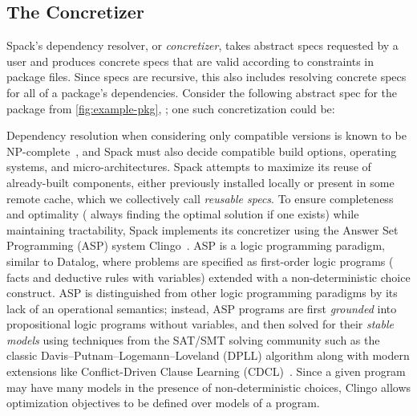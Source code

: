 \subsection{The Concretizer}
\label{sec:spack-concretizer}
Spack's dependency resolver, or {\it concretizer}, takes abstract specs
requested by a user and produces concrete specs that are valid according
to constraints in package files. Since specs are recursive, this also
includes resolving concrete specs for all of a package's
dependencies. Consider the following abstract spec for the package from
\cref{fig:example-pkg}, ; one such concretization could be:

\begin{footnotesize}
\par\vspace{0.8em}\noindent\colorbox{whitesmoke}{\begin{minipage}{0.98\columnwidth}\end{minipage}}\vspace{0.8em}
\end{footnotesize}

Dependency resolution when considering only compatible versions is known to be
NP-complete~\cite{dicosmo2006edos, cox2016version}, and Spack must also decide
compatible build options, operating systems, and micro-architectures.  Spack
attempts to maximize its reuse of already-built components, either
previously installed locally or present in some remote cache, which we
collectively call \textit{reusable specs}. To ensure completeness and optimality
(\ie{} always finding the optimal solution if one exists) while maintaining
tractability, Spack implements its concretizer using the Answer Set Programming
(ASP) system Clingo~\cite{gebser2016potassco, gamblin2022asp}. ASP is a logic
programming paradigm, similar to Datalog, where problems are specified as
first-order logic programs (\ie{} facts and deductive rules with variables)
extended with a non-deterministic choice construct. ASP is distinguished from
other logic programming paradigms by its lack of an operational semantics;
instead, ASP programs are first \textit{grounded} into propositional logic
programs without variables, and then solved for their \textit{stable models}
using techniques from the SAT/SMT solving community such as the classic
Davis–Putnam–Logemann–Loveland (DPLL) algorithm along with modern extensions
like Conflict-Driven Clause Learning (CDCL)~\cite{davis1960computing,
  davis1962machine, moskewicz2001chaff}. Since a given program may have many
models in the presence of non-deterministic choices, Clingo allows
optimization objectives to be defined over models of a program.


